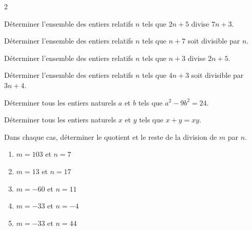 \documentclass[a4paper,12pt]{article}
\begin{document}
\begin{multicols}{2}
    \begin{exercice}[title=Exercice 8 $\quad \star \quad$ { [Calculer] }]{}{}
    Déterminer l’ensemble des entiers relatifs $n$ tels que $2n + 5$ divise $7n + 3$.
    \end{exercice}
    
    \begin{exercice}[title=Exercice 9 $\quad \star \quad$ { [Calculer] }]{}{}
    Déterminer l’ensemble des entiers relatifs $n$ tels que $n + 7$ soit divisible par $n$.
    \end{exercice}
    
    \begin{exercice}[title=Exercice 10 $\quad \star \quad$ { [Calculer] }]{}{}
    Déterminer l’ensemble des entiers relatifs $n$ tels que $n + 3$ divise $2n + 5$.
    \end{exercice}
    
    \begin{exercice}[title=Exercice 11 $\quad \star \quad$ { [Calculer] }]{}{}
    Déterminer l’ensemble des entiers relatifs $n$ tels que $4n + 3$ soit divisible par $3n + 4$.
    \end{exercice}
    
    \begin{exercice}[title=Exercice 12 $\quad \star \quad$ { [Calculer, Chercher] }]{}{}
    Déterminer tous les entiers naturels $a$ et $b$ tels que $a^2 - 9b^2 = 24$.
    \end{exercice}
    
    \begin{exercice}[title=Exercice 13 $\quad \star \star \quad$ { [Calculer, Chercher] }]{}{}
    Déterminer tous les entiers naturels $x$ et $y$ tels que $x + y = xy$.
    \end{exercice}
    
    \begin{exercice}[title=Exercice 14 $\quad \star \quad$ { [Calculer] }]{}{}
    Dans chaque cas, déterminer le quotient et le reste de la division de $m$ par $n$.
    \begin{enumerate}
        \item $m = 103$ et $n = 7$
        \item $m = 13$ et $n = 17$
        \item $m = -60$ et $n = 11$
        \item $m = -33$ et $n = -4$
        \item $m = -33$ et $n = 44$
    \end{enumerate}
    \end{exercice}


\end{multicols}
\end{document}
